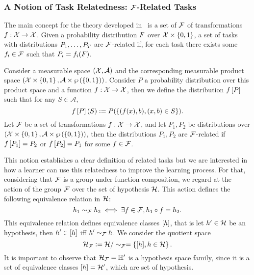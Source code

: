 \subsubsection*{A Notion of Task Relatedness: $\mathcal{F}$-Related Tasks}
The main concept for the theory developed in~\cite{Ben-DavidB08} is a set of $\mathcal{F}$ of transformations $f: \mathcal{X} \to \mathcal{X}$. Given a probability distribution $F$ over $\mathcal{X} \times \left\{0, 1\right\}$, a set of tasks with distributions $P_1, \ldots, P_T$ are $\mathcal{F}$-related if, for each task there exists some $f_i \in \mathcal{F}$ such that $P_i = f_i(F)$.

\begin{definition}
    Consider a measurable space $(\mathcal{X}, \mathcal{A})$ and the corresponding measurable product space $(\mathcal{X} \times \left\{0, 1\right\}, \mathcal{A} \times \wp\left( \left\{0, 1\right\} \right))$. Consider $P$ a probability distribution over this product space and a function $f: \mathcal{X} \to \mathcal{X}$, then we define the distribution $f\left[ P \right]$ such that for any $S \in \mathcal{A}$,
    $$ f\left[ P \right](S) \vcentcolon= P(\left\{(f(x), b), (x, b) \in S \right\}).$$
    Let $\mathcal{F}$ be a set of transformations $f: \mathcal{X} \to \mathcal{X}$, and let $P_1, P_2$ be distributions over $(\mathcal{X} \times \left\{0, 1\right\}, \mathcal{A} \times \wp\left( \left\{0, 1\right\} \right))$, then the distributions $P_1, P_2$ are $\mathcal{F}$-related if $f\left[ P_1 \right]= P_2$ or $f\left[ P_2 \right] = P_1$ for some $f \in \mathcal{F}$.
\end{definition}
This notion establishes a clear definition of related tasks but we are interested in how a learner can use this relatedness to improve the learning process.
For that, considering that $\mathcal{F}$ is a group under function composition, we regard at the action of the group $\mathcal{F}$ over the set of hypothesis $\mathcal{H}$. This action defines the following equivalence relation in $\mathcal{H}$:
$$ h_1 \sim_{\mathcal{F}} h_2 \iff \exists f \in \mathcal{F},  h_1 \circ f = h_2 .$$
%
This equivalence relation defines equivalence classes $\lbrack h\rbrack$, that is let $h' \in \mathcal{H}$ be an hypothesis, then $h' \in \lbrack h\rbrack$ iff $h' \sim_{\mathcal{F}} h$. 
We consider the quotient space 
$$\mathcal{H}_{\mathcal{F}} \vcentcolon= \mathcal{H} / \sim_{\mathcal{F}} = \left\{\lbrack h\rbrack, h \in \mathcal{H}\right\}.$$
It is important to observe that $\mathcal{H}_{\mathcal{F}} = \mathbb{H}'$ is a hypothesis space family, since it is a set of equivalence classes $\lbrack h\rbrack = \mathcal{H}'$, which are set of hypothesis.
%


